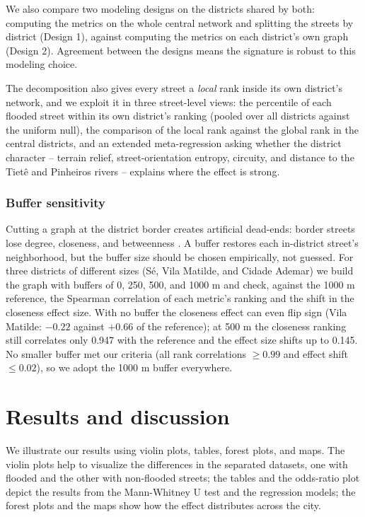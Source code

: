\documentclass[sn-nature]{sn-jnl}%
\theoremstyle{thmstyleone}%
\theoremstyle{thmstyletwo}%
\theoremstyle{thmstylethree}%
\begin{document}
We also compare two modeling designs on the districts shared by both: computing the metrics on the whole central network and splitting the streets by district (Design 1), against computing the metrics on each district's own graph (Design 2). Agreement between the designs means the signature is robust to this modeling choice.

The decomposition also gives every street a \emph{local} rank inside its own district's network, and we exploit it in three street-level views: the percentile of each flooded street within its own district's ranking (pooled over all districts against the uniform null), the comparison of the local rank against the global rank in the central districts, and an extended meta-regression asking whether the district character -- terrain relief, street-orientation entropy, circuity, and distance to the Tietê and Pinheiros rivers -- explains where the effect is strong.

\subsubsection{Buffer sensitivity}
\label{sec:buffer}

Cutting a graph at the district border creates artificial dead-ends: border streets lose degree, closeness, and betweenness \cite{gil2017}. A buffer restores each in-district street's neighborhood, but the buffer size should be chosen empirically, not guessed. For three districts of different sizes (Sé, Vila Matilde, and Cidade Ademar) we build the graph with buffers of 0, 250, 500, and 1000 m and check, against the 1000 m reference, the Spearman correlation of each metric's ranking and the shift in the closeness effect size. With no buffer the closeness effect can even flip sign (Vila Matilde: $-0.22$ against $+0.66$ of the reference); at 500 m the closeness ranking still correlates only 0.947 with the reference and the effect size shifts up to 0.145. No smaller buffer met our criteria (all rank correlations $\geq 0.99$ and effect shift $\leq 0.02$), so we adopt the 1000 m buffer everywhere.

\section{Results and discussion}
\label{ch:chap3}

We illustrate our results using violin plots, tables, forest plots, and maps. The violin plots help to visualize the differences in the separated datasets, one with flooded and the other with non-flooded streets; the tables and the odds-ratio plot depict the results from the Mann-Whitney U test and the regression models; the forest plots and the maps show how the effect distributes across the city.
\end{document}
